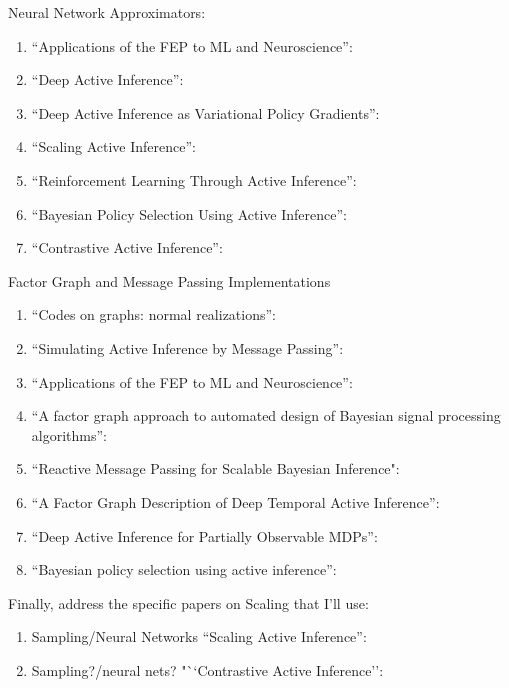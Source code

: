 \documentclass[onecolumn]{IEEEtran}
\begin{document}
Neural Network Approximators:
\begin{enumerate}
	\item ``Applications of the FEP to ML and Neuroscience'': \textcite{Applications-of-FEP-Machine-Learning-Neuroscience}
	\item ``Deep Active Inference'': \textcite{Deep-AIF}
	\item ``Deep Active Inference as Variational Policy Gradients'': \textcite{Deep-AIF-As-Var-Policy-Grad}
	\item ``Scaling Active Inference'': \textcite{Scaling-AIF}
	\item ``Reinforcement Learning Through Active Inference'': \textcite{Reinforcement-Learning-Through-AIF}
	\item ``Bayesian Policy Selection Using Active Inference'': \textcite{Bayesian-Policy-Selection-Using-AIF}
	\item ``Contrastive Active Inference'': \textcite{Contrastive-AIF}
\end{enumerate}

Factor Graph and Message Passing Implementations
\begin{enumerate}
	\item ``Codes on graphs: normal realizations'': \textcite{Codes-on-Graphs}
	\item ``Simulating Active Inference by Message Passing'': \textcite{Simulating-AIF-By-Message-Passing}
	\item ``Applications of the FEP to ML and Neuroscience'': \textcite{Applications-of-FEP-Machine-Learning-Neuroscience}
	\item ``A factor graph approach to automated design of Bayesian signal processing algorithms'': \textcite{Factor-Graph-Approach-Automated-Design-Bayesian-Algos}
	\item ``Reactive Message Passing for Scalable Bayesian Inference": \textcite{Reactive-MP}
	\item ``A Factor Graph Description of Deep Temporal Active Inference'': \textcite{Factor-Graph-Desc-Deep-Temp-AIF}
	\item ``Deep Active Inference for Partially Observable MDPs'': \textcite{DEEP-AIF-For-POMDPs}
	\item ``Bayesian policy selection using active inference'': \textcite{Bayesian-Policy-Selection-AIF}
\end{enumerate}

Finally, address the specific papers on Scaling that I'll use:
\begin{enumerate}
	\item Sampling/Neural Networks ``Scaling Active Inference'': \textcite{Scaling-AIF}
	\item Sampling?/neural nets? "``Contrastive Active Inference'': \textcite{Contrastive-AIF}
\end{enumerate}
\end{document}
